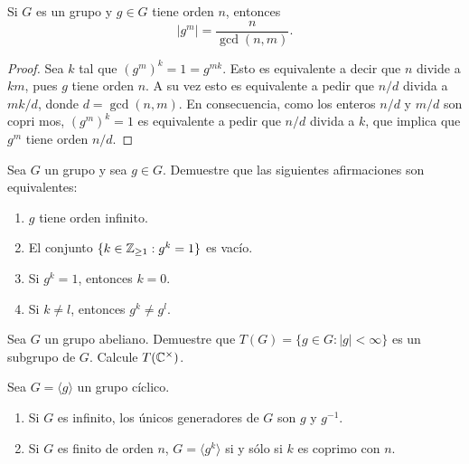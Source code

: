 \begin{corollary}
        Si $G$ es un grupo y $g\in G$ tiene orden $n$, entonces
        \[
        |g^m|=\frac{n}{\gcd(n,m)}.
        \]
        \end{corollary}
        
        \begin{proof}
        Sea $k$ tal que $(g^m)^k=1=g^{mk}$. Esto es equivalente a decir que $n$ divide a $km$, pues $g$ tiene
         orden $n$. A su vez esto
        es equivalente a pedir que
        $n/d$ divida a $mk/d$, donde $d=\gcd(n,m)$. En consecuencia, como los enteros $n/d$ y $m/d$ son copri
        mos, $(g^m)^k=1$ es equivalente a pedir que $n/d$ divida a $k$, que implica que $g^m$ tiene orden $n/
        d$.
        \end{proof}
        
        \begin{exercise}
        Sea $G$ un grupo y sea $g\in G$. Demuestre que las siguientes afirmaciones son equivalentes:
        \begin{enumerate}
        \item $g$ tiene orden infinito.
        \item El conjunto $\{k\in\mathbb{Z}_{\geq1}:g^k=1\}$ es vacío.
        \item Si $g^k=1$, entonces $k=0$.
        \item Si $k\ne l$, entonces $g^k\ne g^l$.
        \end{enumerate}
        \end{exercise}

        \begin{exercise}
                        Sea $G$ un grupo abeliano. Demuestre que $T(G)=\{g\in G:|g|<\infty\}$ es un subgrupo de $G$. Calcule $T(\mathbb{C}^\times)$.
                \end{exercise}
                
                \begin{exercise}
                        Sea $G=\langle g\rangle$ un grupo cíclico.
                        \begin{enumerate}
                                \item Si $G$ es infinito, los únicos generadores de $G$ son $g$ y $g^{-1}$.
                                \item Si $G$ es finito de orden $n$, $G=\langle g^k\rangle$ si y sólo
                                        si $k$ es coprimo con $n$.
                        \end{enumerate}
                \end{exercise}
                
